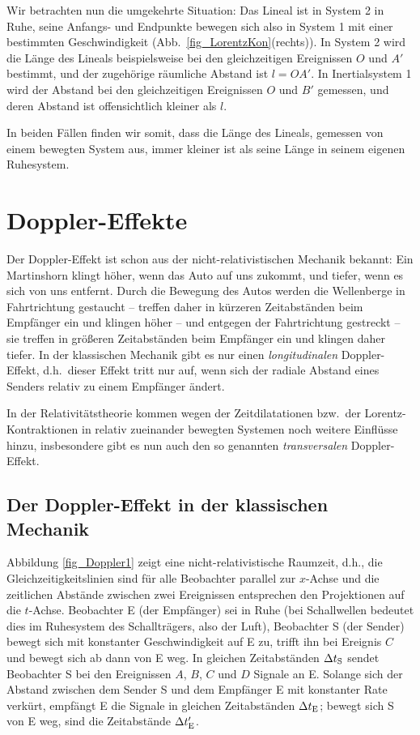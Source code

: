Wir betrachten nun die umgekehrte Situation:
Das Lineal ist in System 2 in Ruhe, seine
Anfangs- und Endpunkte bewegen sich also
in System 1 mit einer bestimmten 
Geschwindigkeit (Abb.\ \ref{fig_LorentzKon}(rechts)).
In System 2 wird die L\"ange des Lineals
beispielsweise bei den gleichzeitigen
Ereignissen $O$ und $A'$ bestimmt, und
der zugeh\"orige r\"aumliche Abstand 
ist $l=OA'$. In Inertialsystem 1 wird der
Abstand bei den gleichzeitigen Ereignissen
$O$ und $B'$ gemessen, und deren
Abstand ist offensichtlich kleiner als $l$. 

In beiden F\"allen finden wir somit, dass
die L\"ange des Lineals, gemessen von einem
bewegten System aus, immer kleiner ist
als seine L\"ange in seinem eigenen
Ruhesystem. 

\section{Doppler-Effekte}

Der Doppler-Effekt ist schon aus der 
nicht-relativistischen Mechanik bekannt:
Ein Martinshorn klingt h\"oher, wenn das
Auto auf uns zukommt, und tiefer, wenn es
sich von uns entfernt. Durch die Bewegung
des Autos werden die Wellenberge in 
Fahrtrichtung gestaucht -- treffen daher
in k\"urzeren Zeitabst\"anden beim Empf\"anger
ein und klingen h\"oher -- und entgegen der
Fahrtrichtung gestreckt -- sie treffen in 
gr\"o\ss eren Zeitabst\"anden beim Empf\"anger
ein und klingen daher tiefer. In der klassischen
Mechanik gibt es nur einen {\em longitudinalen}
Doppler-Effekt, d.h.\ dieser Effekt tritt nur auf,
wenn sich der radiale Abstand eines Senders
relativ zu einem Empf\"anger \"andert.

In der Relativit\"atstheorie kommen wegen
der Zeitdilatationen bzw.\ der Lorentz-Kontraktionen
in relativ zueinander bewegten Systemen
noch weitere Einfl\"usse 
hinzu, insbesondere gibt es nun auch den
so genannten {\em transversalen} Doppler-Effekt.

\subsection{Der Doppler-Effekt in der klassischen Mechanik}

Abbildung \ref{fig_Doppler1} zeigt eine nicht-relativistische
Raumzeit, d.h., die Gleichzeitigkeitslinien sind f\"ur alle
Beobachter parallel zur $x$-Achse und die zeitlichen
Abst\"ande zwischen zwei Ereignissen entsprechen
den Projektionen auf die $t$-Achse. Beobachter
E (der Empf\"anger) sei in Ruhe (bei Schallwellen 
bedeutet dies im Ruhesystem des Schalltr\"agers, also der Luft), 
Beobachter S (der Sender) bewegt
sich mit konstanter Geschwindigkeit auf E zu, trifft ihn bei 
Ereignis $C$ und bewegt sich ab dann von E weg. 
In gleichen Zeitabst\"anden $\Delta t_{\rm S}$ sendet Beobachter S
bei den Ereignissen $A$, $B$, $C$ und $D$ Signale an E.
Solange sich der Abstand zwischen dem Sender S 
und dem Empf\"anger E mit konstanter Rate verk\"urt, 
empf\"angt E die Signale
in gleichen Zeitabst\"anden $\Delta t_{\rm E}$; bewegt
sich S von E weg, sind die Zeitabst\"ande $\Delta t_{\rm E}'$.


